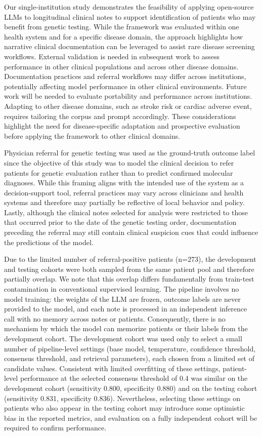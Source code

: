 \documentclass[fleqn,10pt]{wlscirep}
\begin{document}
Our single-institution study demonstrates the feasibility of applying open-source LLMs to longitudinal clinical notes to support identification of patients who may benefit from genetic testing. While the framework was evaluated within one health system and for a specific disease domain, the approach highlights how narrative clinical documentation can be leveraged to assist rare disease screening workflows. External validation is needed in subsequent work to assess performance in other clinical populations and across other disease domains. Documentation practices and referral workflows may differ across institutions, potentially affecting model performance in other clinical environments. Future work will be needed to evaluate portability and performance across institutions. Adapting to other disease domains, such as stroke risk or cardiac adverse event, requires tailoring the corpus and prompt accordingly. These considerations highlight the need for disease-specific adaptation and prospective evaluation before applying the framework to other clinical domains.

Physician referral for genetic testing was used as the ground-truth outcome label since the objective of this study was to model the clinical decision to refer patients for genetic evaluation rather than to predict confirmed molecular diagnoses. While this framing aligns with the intended use of the system as a decision-support tool, referral practices may vary across clinicians and health systems and therefore may partially be reflective of local behavior and policy. Lastly, although the clinical notes selected for analysis were restricted to those that occurred prior to the date of the genetic testing order, documentation preceding the referral may still contain clinical suspicion cues that could influence the predictions of the model.

Due to the limited number of referral-positive patients (n=273), the development and testing cohorts were both sampled from the same patient pool and therefore partially overlap. We note that this overlap differs fundamentally from train-test contamination in conventional supervised learning. The pipeline involves no model training: the weights of the LLM are frozen, outcome labels are never provided to the model, and each note is processed in an independent inference call with no memory across notes or patients. Consequently, there is no mechanism by which the model can memorize patients or their labels from the development cohort. The development cohort was used only to select a small number of pipeline-level settings (base model, temperature, confidence threshold, consensus threshold, and retrieval parameters), each chosen from a limited set of candidate values. Consistent with limited overfitting of these settings, patient-level performance at the selected consensus threshold of 0.4 was similar on the development cohort (sensitivity 0.800, specificity 0.880) and on the testing cohort (sensitivity 0.831, specificity 0.836). Nevertheless, selecting these settings on patients who also appear in the testing cohort may introduce some optimistic bias in the reported metrics, and evaluation on a fully independent cohort will be required to confirm performance.
\end{document}
